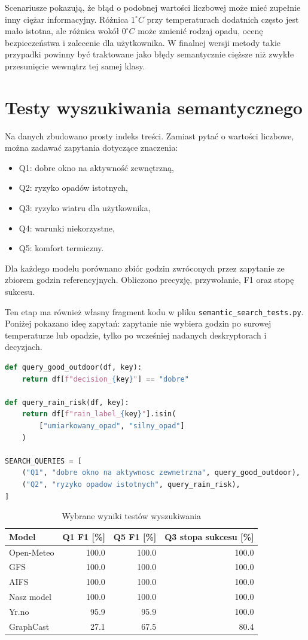 \documentclass[a4paper,12pt]{article}
\begin{document}
Scenariusze pokazują, że błąd o podobnej wartości liczbowej może mieć zupełnie
inny ciężar informacyjny. Różnica \(1^\circ C\) przy temperaturach dodatnich
często jest mało istotna, ale różnica wokół \(0^\circ C\) może zmienić rodzaj
opadu, ocenę bezpieczeństwa i zalecenie dla użytkownika. W finalnej wersji
metody takie przypadki powinny być traktowane jako błędy semantycznie cięższe
niż zwykłe przesunięcie wewnątrz tej samej klasy.

\section{Testy wyszukiwania semantycznego}

Na danych zbudowano prosty indeks treści. Zamiast pytać o wartości liczbowe,
można zadawać zapytania dotyczące znaczenia:
\begin{itemize}
    \item Q1: dobre okno na aktywność zewnętrzną,
    \item Q2: ryzyko opadów istotnych,
    \item Q3: ryzyko wiatru dla użytkownika,
    \item Q4: warunki niekorzystne,
    \item Q5: komfort termiczny.
\end{itemize}

Dla każdego modelu porównano zbiór godzin zwróconych przez zapytanie ze zbiorem
godzin referencyjnych. Obliczono precyzję, przywołanie, F1 oraz stopę sukcesu.

Ten etap ma również własny fragment kodu w pliku
\texttt{semantic\_search\_tests.py}. Poniżej pokazano ideę zapytań: zapytanie
nie wybiera godzin po surowej temperaturze lub opadzie, tylko po wcześniej
nadanych deskryptorach i decyzjach.

\begin{lstlisting}[language=Python]
def query_good_outdoor(df, key):
    return df[f"decision_{key}"] == "dobre"

def query_rain_risk(df, key):
    return df[f"rain_label_{key}"].isin(
        ["umiarkowany_opad", "silny_opad"]
    )

SEARCH_QUERIES = [
    ("Q1", "dobre okno na aktywnosc zewnetrzna", query_good_outdoor),
    ("Q2", "ryzyko opadow istotnych", query_rain_risk),
]
\end{lstlisting}

\begin{table}[h]
\centering
\caption{Wybrane wyniki testów wyszukiwania}
\begin{tabular}{lrrr}
\toprule
Model & Q1 F1 [\%] & Q5 F1 [\%] & Q3 stopa sukcesu [\%] \\
\midrule
Open-Meteo & 100.0 & 100.0 & 100.0 \\
GFS & 100.0 & 100.0 & 100.0 \\
AIFS & 100.0 & 100.0 & 100.0 \\
Nasz model & 100.0 & 100.0 & 100.0 \\
Yr.no & 95.9 & 95.9 & 100.0 \\
GraphCast & 27.1 & 67.5 & 80.4 \\
\bottomrule
\end{tabular}
\end{table}
\end{document}
